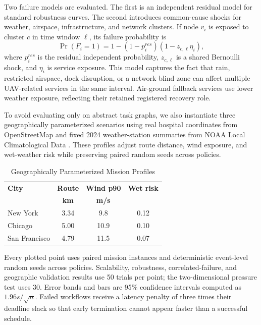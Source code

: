 \documentclass[conference]{IEEEtran}
\begin{document}
Two failure models are evaluated. The first is an independent residual model
for standard robustness curves. The second introduces common-cause shocks for
weather, airspace, infrastructure, and network clusters. If node $v_i$ is
exposed to cluster $c$ in time window $\ell$, its failure probability is
\begin{equation}
\Pr(F_i=1)=1-(1-p_i^{res})(1-z_{c,\ell}\eta_i),
\label{eq:corrfailure}
\end{equation}
where $p_i^{res}$ is the residual independent probability, $z_{c,\ell}$ is a
shared Bernoulli shock, and $\eta_i$ is service exposure. This model captures
the fact that rain, restricted airspace, dock disruption, or a network blind
zone can affect multiple UAV-related services in the same interval. Air-ground
fallback services use lower weather exposure, reflecting their retained
registered recovery role.

To avoid evaluating only on abstract task graphs, we also instantiate three
geographically parameterized scenarios using real hospital coordinates from
OpenStreetMap and fixed 2024 weather-station summaries from NOAA Local
Climatological Data \cite{osm2024,noaaLCD2024}. These profiles adjust route
distance, wind exposure, and wet-weather risk while preserving paired random
seeds across policies.

\begin{table}[t]
\caption{Geographically Parameterized Mission Profiles}
\label{tab:geo}
\centering
\footnotesize
\begin{tabular}{lccc}
\toprule
\textbf{City} & \textbf{Route} & \textbf{Wind p90} & \textbf{Wet risk}\\
 & \textbf{km} & \textbf{m/s} & \\
\midrule
New York & 3.34 & 9.8 & 0.12\\
Chicago & 5.00 & 10.9 & 0.10\\
San Francisco & 4.79 & 11.5 & 0.07\\
\bottomrule
\end{tabular}
\end{table}

Every plotted point uses paired mission instances and deterministic
event-level random seeds across policies. Scalability, robustness,
correlated-failure, and geographic validation results use 50 trials per
point; the two-dimensional pressure test uses 30. Error bands and bars are
95\% confidence intervals computed as $1.96s/\sqrt{n}$. Failed workflows
receive a latency penalty of three times their deadline slack so that early
termination cannot appear faster than a successful schedule.
\end{document}
